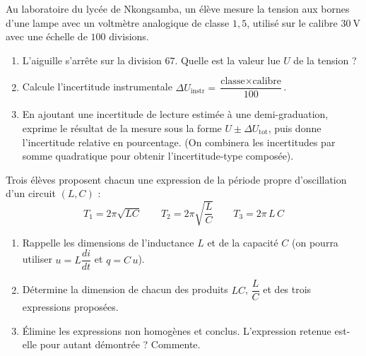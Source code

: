 \documentclass[11pt]{article}
\newcommand{\cle}[1]{{\popxbold\color{popdark}#1}}
\newcounter{popsec}
\newcounter{popsub}
\newcommand{\courssub}[1]{%
  \stepcounter{popsub}%
  \par\vspace{9pt}\noindent{\popxbold\fontsize{11.5}{13}\selectfont\color{popink}{\color{poporange}\thepopsec.\thepopsub}\hspace{6pt}#1}\par\nopagebreak\vspace{4pt}
}
\begin{document}
\courssub{Je m'entraîne}

\begin{exercice}
Au laboratoire du lycée de Nkongsamba, un élève mesure la tension aux bornes d'une lampe avec un voltmètre analogique de \cle{classe} $1,5$, utilisé sur le calibre $30~\text{V}$ avec une échelle de $100$ divisions.
\begin{enumerate}
    \item L'aiguille s'arrête sur la division $67$. Quelle est la valeur lue $U$ de la tension ?
    \item Calcule l'incertitude instrumentale $\Delta U_{\text{instr}} = \dfrac{\text{classe} \times \text{calibre}}{100}$.
    \item En ajoutant une incertitude de lecture estimée à une demi-graduation, exprime le résultat de la mesure sous la forme $U \pm \Delta U_{\text{tot}}$, puis donne l'incertitude relative en pourcentage. (On combinera les incertitudes par somme quadratique pour obtenir l'incertitude-type composée).
\end{enumerate}
\end{exercice}

\begin{exercice}
Trois élèves proposent chacun une expression de la période propre d'oscillation d'un circuit $(L, C)$ :
\[ T_1 = 2\pi\sqrt{LC} \qquad T_2 = 2\pi\sqrt{\dfrac{L}{C}} \qquad T_3 = 2\pi\,L\,C \]
\begin{enumerate}
    \item Rappelle les dimensions de l'inductance $L$ et de la capacité $C$ (on pourra utiliser $u = L\dfrac{di}{dt}$ et $q = C\,u$).
    \item Détermine la dimension de chacun des produits $LC$, $\dfrac{L}{C}$ et des trois expressions proposées.
    \item Élimine les expressions non homogènes et conclus. L'expression retenue est-elle pour autant démontrée ? Commente.
\end{enumerate}
\end{exercice}
\end{document}
